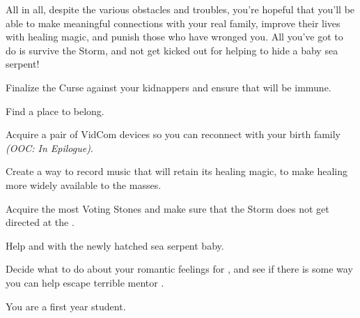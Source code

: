 \documentclass[char]{GL2020}
\begin{document}
{All in all, despite the various obstacles and troubles, you're hopeful that you'll be able to make meaningful connections with your real family, improve their lives with healing magic, and punish those who have wronged you. All you've got to do is survive the Storm, and not get kicked out for helping to hide a baby sea serpent!

\begin{itemz}
    \item Finalize the Curse against your kidnappers and ensure that \cMusic{} will be immune.
    \item Find a place to belong.
    \item Acquire a pair of VidCom devices so you can reconnect with your birth family \emph{(OOC: In Epilogue)}.
    \item Create a way to record music that will retain its healing magic, to make healing more widely available to the masses.
    \item Acquire the most Voting Stones and make sure that the Storm does not get directed at the \pFarm{}.
    \item Help \cPirateChild{} and \cDisney{} with the newly hatched sea serpent baby.
    \item Decide what to do about your romantic feelings for \cScholarship{}, and see if there is some way you can help \cScholarship{\them} escape \cScholarship{\their} terrible mentor \cAntiChup{}.
\end{itemz}

\begin{itemz}[Notes]
    \item You are a first year student.
\end{itemz}

}
\end{document}
